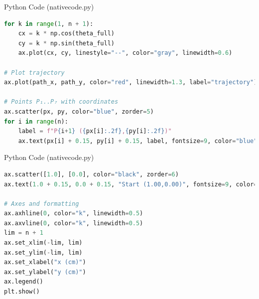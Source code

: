 \documentclass{beamer}
\begin{document}
\begin{frame}[fragile]{Python Code (nativecode.py)}
\begin{lstlisting}[language=Python]
for k in range(1, n + 1):
    cx = k * np.cos(theta_full)
    cy = k * np.sin(theta_full)
    ax.plot(cx, cy, linestyle="--", color="gray", linewidth=0.6)

# Plot trajectory
ax.plot(path_x, path_y, color="red", linewidth=1.3, label="trajectory")

# Points P₁..P₇ with coordinates
ax.scatter(px, py, color="blue", zorder=5)
for i in range(n):
    label = f"P{i+1} ({px[i]:.2f},{py[i]:.2f})"
    ax.text(px[i] + 0.15, py[i] + 0.15, label, fontsize=9, color="blue")
\end{lstlisting}
\end{frame}
\begin{frame}[fragile]{Python Code (nativecode.py)}
\begin{lstlisting}[language=Python]
ax.scatter([1.0], [0.0], color="black", zorder=6)
ax.text(1.0 + 0.15, 0.0 + 0.15, "Start (1.00,0.00)", fontsize=9, color="black")

# Axes and formatting
ax.axhline(0, color="k", linewidth=0.5)
ax.axvline(0, color="k", linewidth=0.5)
lim = n + 1
ax.set_xlim(-lim, lim)
ax.set_ylim(-lim, lim)
ax.set_xlabel("x (cm)")
ax.set_ylabel("y (cm)")
ax.legend()
plt.show()
\end{lstlisting}
\end{frame}
\end{document}

